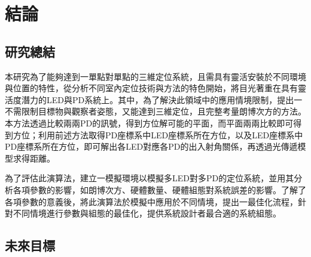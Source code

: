 \chapter{結論}
\label{chp:6}


\section{研究總結}

本研究為了能夠達到一單點對單點的三維定位系統，且需具有靈活安裝於不同環境與位置的特性，從分析不同室內定位技術與方法的特色開始，將目光著重在具有靈活度潛力的LED與PD系統上。其中，為了解決此領域中的應用情境限制，提出一不需限制目標物與觀察者姿態，又能達到三維定位，且完整考量朗博次方的方法。本方法透過比較兩兩PD的訊號，得到方位解可能的平面，而平面兩兩比較即可得到方位；利用前述方法取得PD座標系中LED座標系所在方位，以及LED座標系中PD座標系所在方位，即可解出各LED對應各PD的出入射角關係，再透過光傳遞模型求得距離。

為了評估此演算法，建立一模擬環境以模擬多LED對多PD的定位系統，並用其分析各項參數的影響，如朗博次方、硬體數量、硬體組態對系統誤差的影響。了解了各項參數的意義後，將此演算法於模擬中應用於不同情境，提出一最佳化流程，針對不同情境進行參數與組態的最佳化，提供系統設計者最合適的系統組態。



\section{未來目標}


